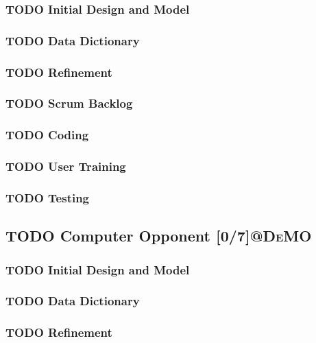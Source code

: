 \documentclass[11pt]{article}
\begin{document}
\subsubsection{{\bfseries\sffamily TODO} Initial Design and Model}
\label{sec:orgc3655ab}
\subsubsection{{\bfseries\sffamily TODO} Data Dictionary}
\label{sec:org4ad717e}
\subsubsection{{\bfseries\sffamily TODO} Refinement}
\label{sec:org0dd4b3c}
\subsubsection{{\bfseries\sffamily TODO} Scrum Backlog}
\label{sec:org641d2a2}
\subsubsection{{\bfseries\sffamily TODO} Coding}
\label{sec:org5c8ca20}
\subsubsection{{\bfseries\sffamily TODO} User Training}
\label{sec:orgbe27e47}
\subsubsection{{\bfseries\sffamily TODO} Testing}
\label{sec:org28d2e91}
\subsection{{\bfseries\sffamily TODO} Computer Opponent  [0/7]\hfill{}\textsc{@DeMO}}
\label{sec:orgf10b9bd}
\subsubsection{{\bfseries\sffamily TODO} Initial Design and Model}
\label{sec:org215a363}
\subsubsection{{\bfseries\sffamily TODO} Data Dictionary}
\label{sec:org56023cf}
\subsubsection{{\bfseries\sffamily TODO} Refinement}
\label{sec:org6a55463}
\end{document}
